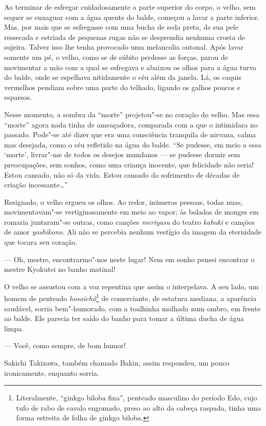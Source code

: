 Ao terminar de esfregar cuidadosamente a parte superior do corpo, o
velho, sem sequer se enxaguar com a água quente do balde, começou a
lavar a parte inferior. Mas, por mais que se esfregasse com uma bucha
de seda preta, de sua pele ressecada e estriada de pequenas rugas não
se desprendia nenhuma crosta de sujeira. Talvez isso lhe tenha
provocado uma melancolia outonal. Após lavar somente um pé, o velho,
como se de súbito perdesse as forças, parou de movimentar a mão com a
qual se esfregava e abaixou os olhos para a água turva do balde, onde
se espelhava nitidamente o céu além da janela. Lá, os caquis vermelhos
pendiam sobre uma parte do telhado, ligando os galhos poucos e esparsos. 

Nesse momento, a sombra da ``morte'' projetou"-se no coração do velho. Mas 
essa ``morte'' agora nada tinha de ameaçadora, comparada com a que o
intimidara no passado. Pode"-se até dizer que era uma consciência 
tranquila de nirvana, calma mas desejada, como o céu refletido na água
do balde. ``Se pudesse, em meio a essa `morte', livrar"-me de todos os 
desejos mundanos --- se pudesse dormir sem preocupações, sem sonhos, como
uma criança inocente, que felicidade não seria! Estou cansado, não só 
da vida. Estou cansado do sofrimento de décadas de criação
incessante\ldots{}''

Resignado, o velho ergueu os olhos. Ao redor, inúmeras pessoas, todas
nuas, movimentavam"-se vertiginosamente em meio ao vapor; às baladas de   
monges em romaria juntaram"-se outras, como canções \textit{meriyasu} do
teatro \textit{kabuki} e canções de amor \textit{yoshikono}. Ali não se percebia
nenhum vestígio da imagem da eternidade que tocara seu coração.

--- Oh, mestre, encontrarmo"-nos neste lugar! Nem em sonho pensei
encontrar o mestre Kyokutei no banho matinal!

O velho se assustou com a voz repentina que assim o interpelava. A seu
lado, um homem de penteado \textit{hosoichô}\footnote{ Literalmente, ``ginkgo biloba fina'', 
penteado masculino do período Edo, cujo tufo de rabo de cavalo 
engomado, preso ao alto da cabeça raspada, tinha uma forma estreita de folha de ginkgo biloba.} 
de comerciante, de estatura mediana, a aparência saudável, sorria bem"-humorado, com a
toalhinha molhada num ombro, em frente ao balde. Ele parecia ter saído
do banho para tomar a última ducha de água limpa.

--- Você, como sempre, de bom humor!

Sakichi Takizawa, também chamado Bakin, assim respondeu, um pouco
ironicamente, enquanto sorria.


